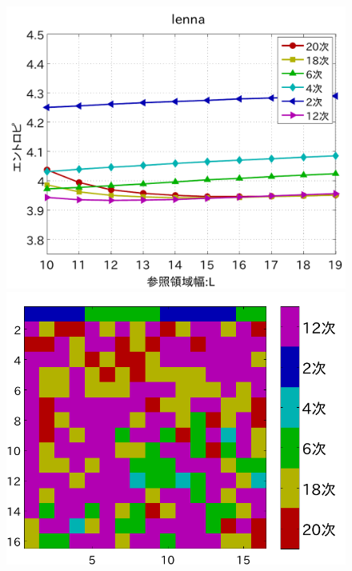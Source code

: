 \documentclass[25pt, landscape,dvipdfmx]{foils}
\begin{document}
\begin{figure}[b]
\begin{flushleft}
\includegraphics[scale=0.75]{fig/test1/lenna.pdf}\\
\vspace{3mm}
\includegraphics[angle=-90,scale=0.75]{fig/test1/l32/yosokusikino.pdf}

\end{flushleft}
\end{figure}
\end{document}
